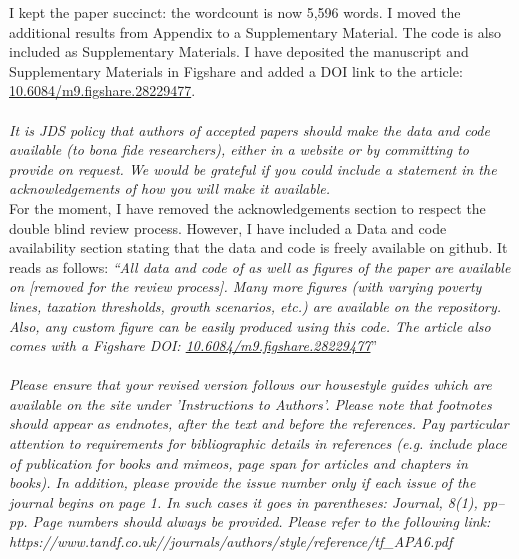 \documentclass[12pt,english]{article}
\begin{document}
I kept the paper succinct: the wordcount is now 5,596 words. I moved the additional results from Appendix to a Supplementary Material. The code is also included as Supplementary Materials. I have deposited the manuscript and Supplementary Materials in Figshare and added a DOI link to the article: \href{https://figshare.com/articles/dataset/dx_doi_org_10_6084_m9_figshare_6025748/6025748}{10.6084/m9.figshare.28229477}.  
~\\ ~\\

\textit{It is JDS policy that authors of accepted papers should make the data and code available (to bona fide researchers), either in a website or by committing to provide on request.  We would be grateful if you could include a statement in the acknowledgements of how you will make it available.}~\\

For the moment, I have removed the acknowledgements section to respect the double blind review process. However, I have included a Data and code availability section stating that the data and code is freely available on github. It reads as follows: \textit{``All data and code of as well as figures of the paper are available on [\textit{removed for the review process}]. Many more figures (with varying poverty lines, taxation thresholds, growth scenarios, etc.) are available on the repository.
Also, any custom figure can be easily produced using this code. The article also comes with a Figshare DOI: \href{https://figshare.com/articles/dataset/dx_doi_org_10_6084_m9_figshare_6025748/6025748}{10.6084/m9.figshare.28229477}}''
~\\ ~\\

\textit{Please ensure that your revised version follows our housestyle guides which are available on the site under 'Instructions to Authors'.  Please note that footnotes should appear as endnotes, after the text and before the references.   Pay particular attention to requirements for bibliographic details in references (e.g. include place of publication for books and mimeos, page span for articles and chapters in books).  In addition, please provide the issue number only if each issue of the journal begins on page 1.  In such cases it goes in parentheses:  Journal, 8(1), pp–pp.  Page numbers should always be provided.  Please refer to the following link:   https://www.tandf.co.uk//journals/authors/style/reference/tf\_APA6.pdf}~\\
\end{document}
